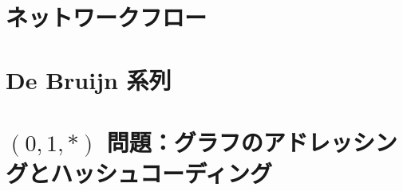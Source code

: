 \documentclass{jarticle}
\begin{document}
\newpage

\section{ネットワークフロー}







\newpage

\section{De Bruijn 系列}





\newpage

\section{$(0,1,*)$ 問題：グラフのアドレッシングとハッシュコーディング}




\end{document}
